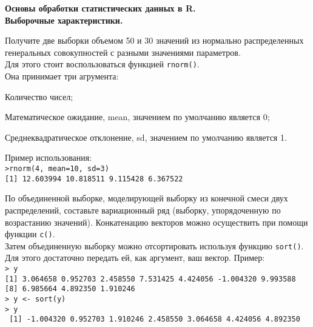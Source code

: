 		\renewenvironment{itemize}{
			\begin{list}{\labelitemi}{
				\setlength{\topsep}{0pt}
				\setlength{\partopsep}{0pt}
				\setlength{\parskip}{0pt}
				\setlength{\itemsep}{0pt}
				\setlength{\parsep}{0pt}
			}
		}
		{\end{list}}
\textbf{Основы обработки статистических данных в R. \\ \indent Выборочные характеристики.}
\begin{enumerate}
	\item Получите две выборки объемом 50 и 30 значений из нормально распределенных генеральных совокупностей с разными значениями параметров.\\
		Для этого стоит воспользоваться функцией \texttt{rnorm()}.\\
		Она принимает три агрумента:
		\begin{itemize}
			\item[--] Количество чисел;
			\item[--] Математическое ожидание, mean, значением по умолчанию является 0; 
			\item[--] Среднеквадратическое отклонение, sd, значением по умолчанию является 1.
		\end{itemize} 
		Пример использования:\\
		\indent \texttt{>rnorm(4, mean=10, sd=3)}\\
		\indent \texttt{[1] 12.603994 10.818511  9.115428  6.367522}
	\item По объединенной выборке, моделирующей выборку из конечной смеси двух распределений, 
		составьте вариационный ряд (выборку, упорядоченную по возрастанию значений).
		Конкатенацию векторов можно осуществить при помощи функции \texttt{c()}.\\
		Затем объединенную выборку можно отсортировать используя функцию \texttt{sort()}. 
		Для этого достаточно передать ей, как аргумент, ваш вектор. Пример:\\
		\indent \texttt{> y} \\
 		\indent \texttt{[1]  3.064658  0.952703  2.458550  7.531425  4.424056 -1.004320  9.993588} \\
 		\indent \texttt{[8]  6.985664  4.892350  1.910246} \\
        \indent \texttt{> y <- sort(y)} \\
		\indent \texttt{> y} \\
		\indent \texttt{ [1] -1.004320  0.952703  1.910246  2.458550  3.064658  4.424056  4.892350} \\

\end{enumerate}
